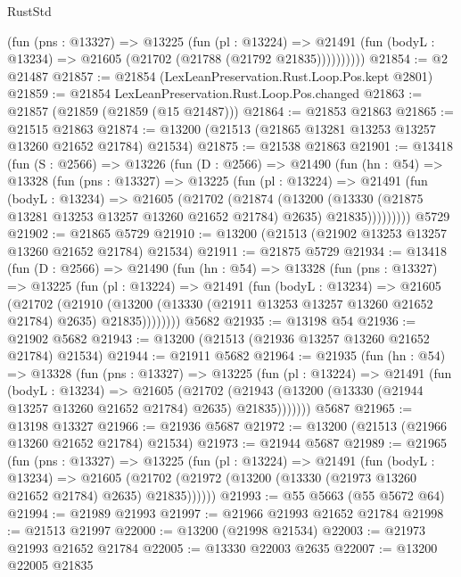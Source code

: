 \begin{lexlean}{RustStd}
\begin{coremodule}
            (fun (pns : @13327) =>
            @13225
              (fun (pl : @13224) =>
              @21491 (fun (bodyL : @13234) => @21605 (@21702 (@21788 (@21792 @21835))))))))))
@21854 := @2 @21487
@21857 := @21854 (LexLeanPreservation.Rust.Loop.Pos.kept @2801)
@21859 := @21854 LexLeanPreservation.Rust.Loop.Pos.changed
@21863 := @21857 (@21859 (@21859 (@15 @21487)))
@21864 := @21853 @21863
@21865 := @21515 @21863
@21874 := @13200 (@21513 (@21865 @13281 @13253 @13257 @13260 @21652 @21784) @21534)
@21875 := @21538 @21863
@21901 := @13418
    (fun (S : @2566) =>
    @13226
      (fun (D : @2566) =>
      @21490
        (fun (hn : @54) =>
        @13328
          (fun (pns : @13327) =>
          @13225
            (fun (pl : @13224) =>
            @21491
              (fun (bodyL : @13234) =>
              @21605
                (@21702
                  (@21874
                    (@13200
                      (@13330 (@21875 @13281 @13253 @13257 @13260 @21652 @21784) @2635)
                      @21835)))))))))
    @5729
@21902 := @21865 @5729
@21910 := @13200 (@21513 (@21902 @13253 @13257 @13260 @21652 @21784) @21534)
@21911 := @21875 @5729
@21934 := @13418
    (fun (D : @2566) =>
    @21490
      (fun (hn : @54) =>
      @13328
        (fun (pns : @13327) =>
        @13225
          (fun (pl : @13224) =>
          @21491
            (fun (bodyL : @13234) =>
            @21605
              (@21702
                (@21910
                  (@13200 (@13330 (@21911 @13253 @13257 @13260 @21652 @21784) @2635) @21835))))))))
    @5682
@21935 := @13198 @54
@21936 := @21902 @5682
@21943 := @13200 (@21513 (@21936 @13257 @13260 @21652 @21784) @21534)
@21944 := @21911 @5682
@21964 := @21935
    (fun (hn : @54) =>
    @13328
      (fun (pns : @13327) =>
      @13225
        (fun (pl : @13224) =>
        @21491
          (fun (bodyL : @13234) =>
          @21605
            (@21702
              (@21943 (@13200 (@13330 (@21944 @13257 @13260 @21652 @21784) @2635) @21835)))))))
    @5687
@21965 := @13198 @13327
@21966 := @21936 @5687
@21972 := @13200 (@21513 (@21966 @13260 @21652 @21784) @21534)
@21973 := @21944 @5687
@21989 := @21965
    (fun (pns : @13327) =>
    @13225
      (fun (pl : @13224) =>
      @21491
        (fun (bodyL : @13234) =>
        @21605 (@21702 (@21972 (@13200 (@13330 (@21973 @13260 @21652 @21784) @2635) @21835))))))
@21993 := @55 @5663 (@55 @5672 @64)
@21994 := @21989 @21993
@21997 := @21966 @21993 @21652 @21784
@21998 := @21513 @21997
@22000 := @13200 (@21998 @21534)
@22003 := @21973 @21993 @21652 @21784
@22005 := @13330 @22003 @2635
@22007 := @13200 @22005 @21835

\end{coremodule}
\end{lexlean}
